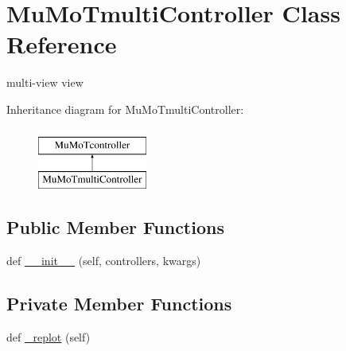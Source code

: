 \hypertarget{class_mu_mo_t_1_1_mu_mo_tmulti_controller}{}\section{Mu\+Mo\+Tmulti\+Controller Class Reference}
\label{class_mu_mo_t_1_1_mu_mo_tmulti_controller}


multi-\/view view  


Inheritance diagram for Mu\+Mo\+Tmulti\+Controller\+:\begin{figure}[H]
\begin{center}
\leavevmode
\includegraphics[height=2.000000cm]{class_mu_mo_t_1_1_mu_mo_tmulti_controller}
\end{center}
\end{figure}
\subsection*{Public Member Functions}
\begin{DoxyCompactItemize}
\item 
def \hyperlink{class_mu_mo_t_1_1_mu_mo_tmulti_controller_a5d04c30f0b85d1b7f2aa0fb1b23dca97}{\+\_\+\+\_\+init\+\_\+\+\_\+} (self, controllers, kwargs)
\end{DoxyCompactItemize}
\subsection*{Private Member Functions}
\begin{DoxyCompactItemize}
\item 
def \hyperlink{class_mu_mo_t_1_1_mu_mo_tmulti_controller_af16e1740482c0100b1ca9530587004d0}{\+\_\+replot} (self)
\end{DoxyCompactItemize}
